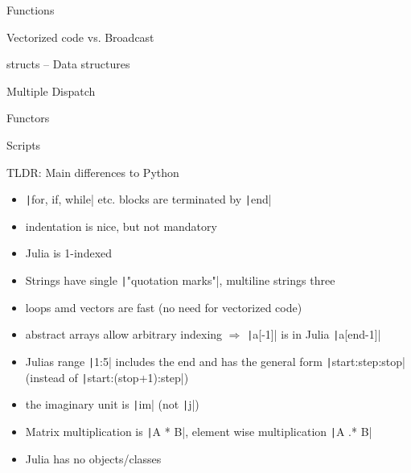 \documentclass[aspectratio=169, 12pt]{beamer}
\begin{document}
    \begin{frame}{Functions}

    \end{frame}
    \begin{frame}{Vectorized code vs. Broadcast}

    \end{frame}
    \begin{frame}{structs – Data structures}

    \end{frame}
    \begin{frame}{Multiple Dispatch}

    \end{frame}
    \begin{frame}{Functors}

    \end{frame}
    \begin{frame}{Scripts}

    \end{frame}
    \begin{frame}[fragile]{TLDR: Main differences to Python}
        \begin{itemize}
            \item \texttt|for, if, while| etc. blocks are terminated by  \texttt|end|
            \item indentation is nice, but not mandatory
            \item \alert{Julia is 1-indexed}
            \item Strings have single \texttt|"quotation marks"|, multiline strings three
            \pause
            \item loops amd vectors are fast (no need for vectorized code)
            \item abstract arrays allow arbitrary indexing $\Rightarrow$ \texttt|a[-1]| is in Julia \texttt|a[end-1]|
            \item Julias range \texttt|1:5| includes the end and has the general form \texttt|start:step:stop| (instead of \texttt|start:(stop+1):step|)
            \item the imaginary unit is \texttt|im| (not \texttt|j|)
            \pause
            \item Matrix multiplication is \texttt|A * B|, element wise multiplication \texttt|A .* B|
            \item Julia has no objects/classes
        \end{itemize}
    \end{frame}
\end{document}

